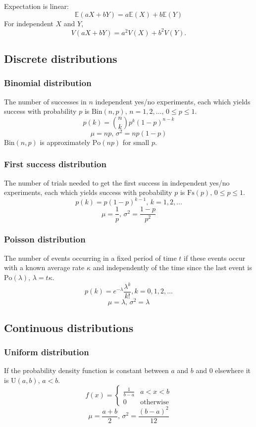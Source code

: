 Expectation is linear:
\[\mathbb{E}(aX+bY) = a\mathbb{E}(X)+b\mathbb{E}(Y)\]
For independent $X$ and $Y$, \[V(aX+bY) = a^2V(X)+b^2V(Y).\]

\subsection{Discrete distributions}

\subsubsection{Binomial distribution}
The number of successes in $n$ independent yes/no experiments, each which yields success with probability $p$ is $\textrm{Bin}(n,p),\,n=1,2,\dots,\, 0\leq p\leq1$.
\[p(k)=\binom{n}{k}p^k(1-p)^{n-k}\]
\[\mu = np,\,\sigma^2=np(1-p)\]
$\textrm{Bin}(n,p)$ is approximately $\textrm{Po}(np)$ for small $p$.

\subsubsection{First success distribution}
The number of trials needed to get the first success in independent yes/no experiments, each which yields success with probability $p$ is $\textrm{Fs}(p),\,0\leq p\leq1$.
\[p(k)=p(1-p)^{k-1},\,k=1,2,\dots\]
\[\mu = \frac1p,\,\sigma^2=\frac{1-p}{p^2}\]

\subsubsection{Poisson distribution}
The number of events occurring in a fixed period of time $t$ if these events occur with a known average rate $\kappa$ and independently of the time since the last event is $\textrm{Po}(\lambda),\,\lambda=t\kappa$.
\[p(k)=e^{-\lambda}\frac{\lambda^k}{k!}, k=0,1,2,\dots\]
\[\mu=\lambda,\,\sigma^2=\lambda\]

\subsection{Continuous distributions}

\subsubsection{Uniform distribution}
If the probability density function is constant between $a$ and $b$ and 0 elsewhere it is $\textrm{U}(a,b),\,a<b$.
\[f(x) = \left\{
\begin{array}{cl}
\frac{1}{b-a} & a<x<b\\
0 & \textrm{otherwise}
\end{array}\right.\]
\[\mu=\frac{a+b}{2},\,\sigma^2=\frac{(b-a)^2}{12}\]


